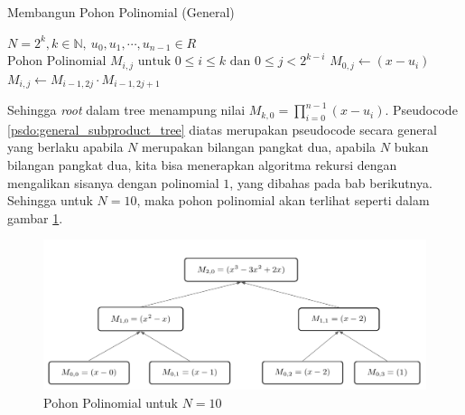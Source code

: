 \begin{algorithm}
	\caption{Membangun Pohon Polinomial (General)}
	\label{psdo:general_subproduct_tree}
	\begin{algorithmic}[1]
		\Require $ N = 2^k, k \in \mathbb{N},\ u_0, u_1, \cdots , u_{n-1} \in R $
		\Ensure $ \text{Pohon Polinomial } M_{i,j} \text{ untuk } 0 \leq i \leq k \text{ dan } 0 \leq j < 2^{k-i} $
		 $ M_{0,j} \gets (x - u_i) $ \EndFor
			 $ M_{i,j} \gets M_{i-1,2j} \cdot M_{i-1,2j+1}$ \EndFor
		\EndFor
	\end{algorithmic}
\end{algorithm}
Sehingga \textit{root} dalam tree menampung nilai $ M_{k,0} = \prod_{i=0}^{n-1} (x - u_i) $. Pseudocode \ref{psdo:general_subproduct_tree} diatas merupakan pseudocode secara general yang berlaku apabila $ N $ merupakan bilangan pangkat dua, apabila $ N $ bukan bilangan pangkat dua, kita bisa menerapkan algoritma rekursi dengan mengalikan sisanya dengan polinomial $ 1 $, yang dibahas pada bab berikutnya. Sehingga untuk $ N = 10 $, maka pohon polinomial akan terlihat seperti dalam gambar \ref{fig:pohon-polinomial-n-10}.
\begin{figure}
	\Centering
	\includegraphics [scale=0.25]{bab2/img/pohon-polinomial-n-10}
	\caption {Pohon Polinomial untuk $ N  = 10 $}
	\label {fig:pohon-polinomial-n-10}
\end{figure}

